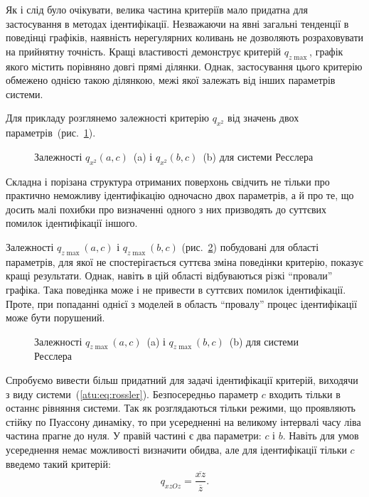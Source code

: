 Як і слід було очікувати, велика частина критеріїв мало
придатна для застосування в методах ідентифікації. Незважаючи
на явні загальні тенденції в поведінці графіків, наявність
нерегулярних коливань не дозволяють розраховувати на прийнятну
точність. Кращі властивості демонструє критерій
$ q_{z \max{}} $, графік якого містить порівняно довгі прямі
ділянки. Однак, застосування цього критерію обмежено однією такою
ділянкою, межі якої залежать від інших параметрів системи.

Для прикладу розглянемо залежності критерію
$q_{x^2} $ від значень двох параметрів~(рис.~\ref{atu:f:ross_q_x2_ac_bc}).

\begin{figure}[htb!]
  \caption{Залежності $ q_{x^2}(a,c)$~(a) і $ q_{x^2}(b,c)$~(b) для системи Ресслера}
\label{atu:f:ross_q_x2_ac_bc}
\end{figure}

Складна і порізана структура отриманих поверхонь свідчить не
тільки про практично неможливу ідентифікацію одночасно двох
параметрів, а й про те, що досить малі похибки про визначенні
одного з них призводять до суттєвих помилок ідентифікації
іншого.

Залежності
$ q_{z \max{}} (a, c) $ і $ q_{z \max{}} (b, c) $ (рис.~\ref{atu:f:ross_q_zmax_ac_bc})
побудовані для області
параметрів, для якої не спостерігається суттєва зміна поведінки
критерію, показує кращі результати. Однак, навіть в цій області
відбуваються різкі ``провали'' графіка. Така поведінка може і не
привести в суттєвих помилок ідентифікації. Проте, при попаданні
однієї з моделей в область ``провалу'' процес ідентифікації
може бути порушений.

\begin{figure}[htb!]
  \caption{Залежності $q_{z \max{}}(a,c) $~(a) і $q_{z \max{}}(b,c)$~(b) для системи Ресслера}
\label{atu:f:ross_q_zmax_ac_bc}
\end{figure}

Спробуємо вивести більш придатний для задачі ідентифікації
критерій, виходячи з виду системи~(\ref{atu:eq:rossler}). Безпосередньо
параметр
$c$ входить тільки в останнє рівняння системи. Так як
розглядаються тільки режими, що проявляють стійку по Пуассону
динаміку, то при усередненні на великому інтервалі часу ліва
частина прагне до нуля. У правій частині є два параметри: $c$ і
$b$. Навіть для умов усереднення немає можливості визначити
обидва, але для ідентифікації тільки
$c$ введемо такий критерій:
%
\begin{equation}
  q_{xzOz} =
  \frac{ \overline{xz}}{ \overline{z}}.
  \label{atu:eq:ross_qzxOz}
\end{equation}


